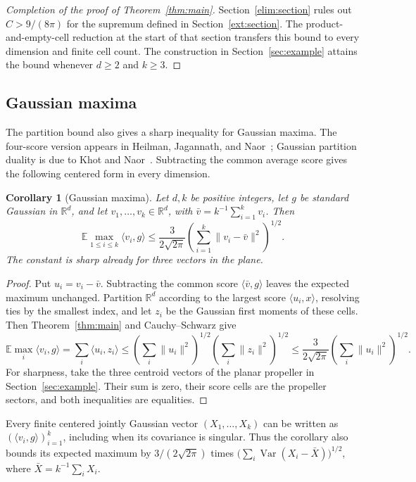 \documentclass[11pt]{article}
\numberwithin{equation}{section}
\newtheorem{corollary}[theorem]{Corollary}
\theoremstyle{definition}
\theoremstyle{remark}
\begin{document}





\begin{proof}[Completion of the proof of Theorem~\ref{thm:main}]
Section~\ref{elim:section} rules out $C>9/(8\pi)$ for the supremum
defined in Section~\ref{ext:section}. The product-and-empty-cell reduction
at the start of that section transfers this bound to every dimension
and finite cell count. The construction in Section~\ref{sec:example}
attains the bound whenever $d\ge2$ and $k\ge3$.
\end{proof}

\subsection{Gaussian maxima}
The partition bound also gives a sharp inequality for Gaussian maxima.
The four-score version appears in Heilman, Jagannath, and
Naor~\cite[Theorem~1.2]{HJN}; Gaussian partition duality is due to
Khot and Naor~\cite[Lemma~3.7]{KhotNaor}. Subtracting the common average
score gives the following centered form in every dimension.

\begin{corollary}[Gaussian maxima]\label{cor:gaussian-maxima}
Let $d,k$ be positive integers, let $g$ be standard Gaussian in
$\mathbb R^d$, and let $v_1,\ldots,v_k\in\mathbb R^d$, with
$\bar v=k^{-1}\sum_{i=1}^k v_i$. Then
\[
 \mathbb E\max_{1\le i\le k}\langle v_i,g\rangle
 \le\frac{3}{2\sqrt{2\pi}}
       \left(\sum_{i=1}^k\|v_i-\bar v\|^2\right)^{1/2}.
\]
The constant is sharp already for three vectors in the plane.
\end{corollary}
\begin{proof}
Put $u_i=v_i-\bar v$. Subtracting the common score
$\langle\bar v,g\rangle$ leaves the expected maximum unchanged.
Partition $\mathbb R^d$ according to the largest score
$\langle u_i,x\rangle$, resolving ties by the smallest index, and let
$z_i$ be the Gaussian first moments of these cells. Then
Theorem~\ref{thm:main} and Cauchy--Schwarz give
\[
 \mathbb E\max_i\langle v_i,g\rangle
 =\sum_i\langle u_i,z_i\rangle
 \le\left(\sum_i\|u_i\|^2\right)^{1/2}
      \left(\sum_i\|z_i\|^2\right)^{1/2}
 \le\frac{3}{2\sqrt{2\pi}}
      \left(\sum_i\|u_i\|^2\right)^{1/2}.
\]
For sharpness, take the three centroid vectors of the planar propeller
in Section~\ref{sec:example}. Their sum is zero, their score cells are
the propeller sectors, and both inequalities are equalities.
\end{proof}

Every finite centered jointly Gaussian vector $(X_1,\ldots,X_k)$ can be
written as $(\langle v_i,g\rangle)_{i=1}^k$, including when its
covariance is singular. Thus the corollary also bounds its expected maximum by
$3/(2\sqrt{2\pi})$ times
$\bigl(\sum_i\operatorname{Var}(X_i-\bar X)\bigr)^{1/2}$, where
$\bar X=k^{-1}\sum_iX_i$.



\appendix



\end{document}
